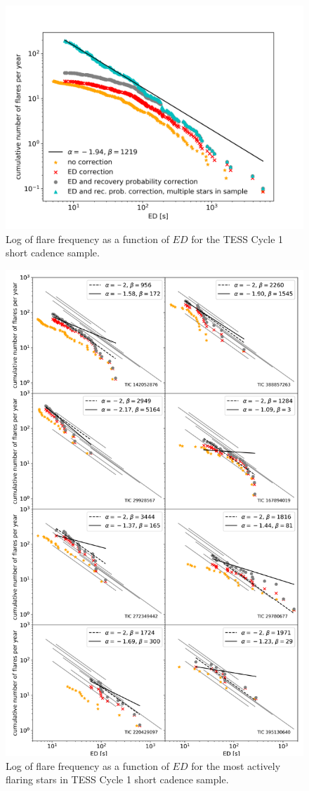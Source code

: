 \documentclass{aastex62}
\begin{document}
\begin{figure}
	\includegraphics[width=0.5\columnwidth]{12_03_2020_13_03_full_sample_ffd.png}
    \caption{Log of flare frequency as a function of $ED$ for the TESS Cycle 1 short cadence sample.}
    \label{fig:ffd_all_ed}
\end{figure}

\begin{figure}
	\includegraphics[width=.8\columnwidth]{12_03_2020_14_10_individual_target_ffds.png}
    \caption{Log of flare frequency as a function of $ED$ for the most actively flaring stars in TESS Cycle 1 short cadence sample.}
    \label{fig:ffd_indiv_ed}
\end{figure}
\end{document}
